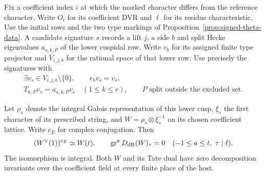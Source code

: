\begin{auxlemma}
\label{lem:initial-row-signature-tests}
Fix a coefficient index \(i\) at which the marked character differs
from the reference character. Write \(O_i\) for its coefficient DVR and \(\ell\) for its residue characteristic. Use the initial rows and the two type markings of Proposition~\ref{prop:signed-theta-data}. A candidate signature \(s\) records a lift \(j\), a side \(b\) and
split Hecke eigenvalues \(a_{s,k,P}\) of the lower cuspidal row. Write
\(e_b\) for its assigned finite type projector and \(V_{i,j,b}\) for
the rational space of that lower row. Use precisely the signatures with
\[
 \begin{gathered}
 \exists v_s\in V_{i,j,b}\setminus\{0\},\qquad e_bv_s=v_s,\\
 T_{k,P}v_s=a_{s,k,P}v_s\quad(1\le k\le r),\qquad
 P\text{ split outside the excluded set}.
 \end{gathered}
\]

Let \(\rho_s\) denote the integral Galois representation of this
lower cusp, \(\xi_s\) the first character of its prescribed string,
and \(W=\rho_s\otimes\xi_s^{-1}\) on its chosen coefficient lattice.
Write \(c_E\) for complex conjugation. Then
\[
 (W^\vee(1))^{c_E}\simeq W(t),\qquad
 \operatorname{gr}^a D_{\rm dR}(W)_\tau=0
       \quad(-1\le a\le t,\ \tau\mid\ell).
\]
The isomorphism is integral. Both \(W\) and its Tate dual have
zero decomposition invariants over the coefficient field at every
finite place of the host.
\end{auxlemma}
